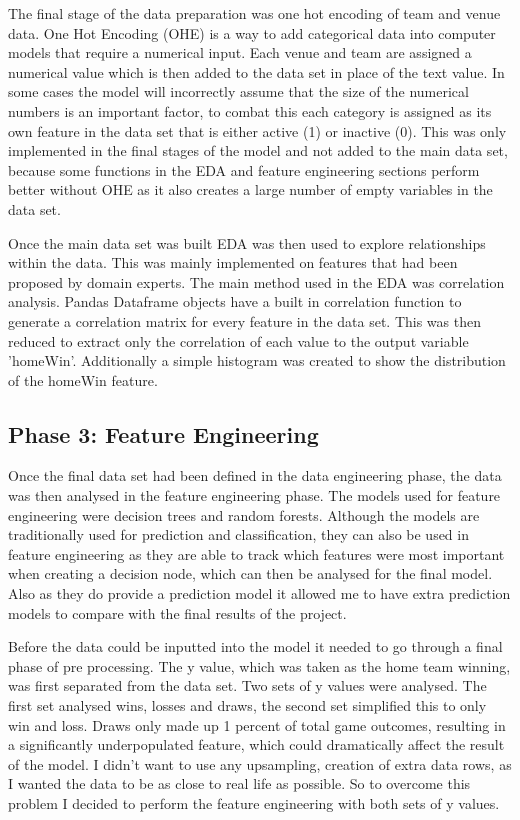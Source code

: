 \documentclass{imc-inf}
\begin{document}
	The final stage of the data preparation was one hot encoding of team and venue data. One Hot Encoding (OHE) is a way to add categorical data into computer models that require a numerical input. Each venue and team are assigned a numerical value which is then added to the data set in place of the text value. In some cases the model will incorrectly assume that the size of the numerical numbers is an important factor, to combat this each category is assigned as its own feature in the data set that is either active (1) or inactive (0). This was only implemented in the final stages of the model and not added to the main data set, because some functions in the EDA and feature engineering sections perform better without OHE as it also creates a large number of empty variables in the data set.
	
	Once the main data set was built EDA was then used to explore relationships within the data. This was mainly implemented on features that had been proposed by domain experts. The main method used in the EDA was correlation analysis. Pandas Dataframe objects have a built in correlation function to generate a correlation matrix for every feature in the data set. This was then reduced to extract only the correlation of each value to the output variable 'homeWin'. Additionally a simple histogram was created to show the distribution of the homeWin feature. 
	
	\subsection{Phase 3: Feature Engineering}
	Once the final data set had been defined in the data engineering phase, the data was then analysed in the feature engineering phase. The models used for feature engineering were decision trees and random forests. Although the models are traditionally used for prediction and classification, they can also be used in feature engineering as they are able to track which features were most important when creating a decision node, which can then be analysed for the final model. Also as they do provide a prediction model it allowed me to have extra prediction models to compare with the final results of the project. 
	
	Before the data could be inputted into the model it needed to go through a final phase of pre processing. The y value, which was taken as the home team winning, was first separated from the data set. Two sets of y values were analysed. The first set analysed wins, losses and draws, the second set simplified this to only win and loss. Draws only made up 1 percent of total game outcomes, resulting in a significantly underpopulated feature, which could dramatically affect the result of the model. I didn't want to use any upsampling, creation of extra data rows, as I wanted the data to be as close to real life as possible. So to overcome this problem I decided to perform the feature engineering with both sets of y values.
	
\end{document}
